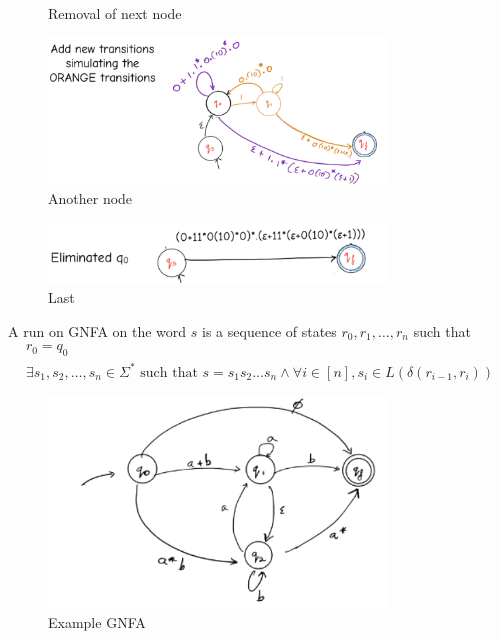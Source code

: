 \documentclass[a4paper]{article}
\theoremstyle{plain}
\theoremstyle{definition}
\newtheorem{defn}{Definition}[section]
\newtheorem{exmp}{Example}[section]
\theoremstyle{remark}
\begin{document}
\begin{tcolorbox}[colback=black!3!white,colframe=black!60!white,breakable,enhanced,title=\begin{exmp}NFA To Regular Expression \label{NFA To Regular Expression}\end{exmp}]
\begin{figure}[H]
		\caption{Removal of next node}
		\label{fig:nine-png}
	\end{figure}
	\begin{figure}[H]
		\centering
		\includegraphics[width=0.8\textwidth]{ten.png}
		\caption{Another node}
		\label{fig:ten-png}
	\end{figure}
	\begin{figure}[H]
		\centering
		\includegraphics[width=0.8\textwidth]{eleven.png}
		\caption{Last}
		\label{fig:eleven-png}
	\end{figure}
\end{tcolorbox}
\begin{tcolorbox}[colback=black!3!white,colframe=black!60!white,title=\begin{defn}GNFA \label{GNFA}\end{defn}]
A run on GNFA on the word $s$ is a sequence of states $r_0,r_1,\ldots,r_n$ such that
\begin{align}
r_0=q_0\\
\exists s_1,s_2,\ldots,s_n \in \Sigma^{*} \text{ such that }s=s_1s_2\ldots s_n \land \forall i \in [n], s_i \in L(\delta(r_{i-1},r_i))
\end{align}
\begin{figure}[H]
	\centering
	\includegraphics[width=0.8\textwidth]{twelve.png}
	\caption{Example GNFA}
	\label{fig:twelve-png}
\end{figure}
\end{tcolorbox}
\end{document}
